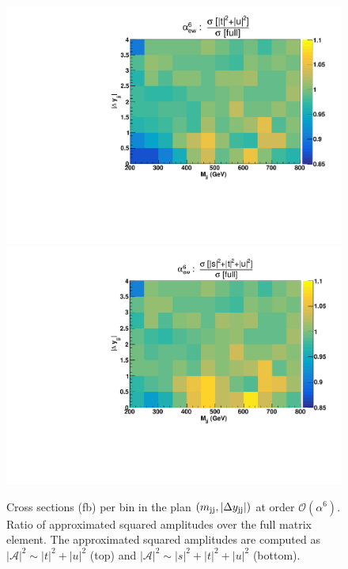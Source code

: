 \begin{figure}[hbt]
\centering
\includegraphics[scale=0.395]{figures/scanfigures/ratio_tu.pdf}
\includegraphics[scale=0.395]{figures/scanfigures/ratio_stu.pdf}
\caption{Cross sections (fb) per bin in the plan $\left(m_{\text{j}\text{j}}, |\Delta y_{\text{j}\text{j}}| \right)$ at order $\mathcal{O}(\alpha^6)$.
Ratio of approximated squared amplitudes over the full matrix element. The approximated squared amplitudes are computed as $|\mathcal{A}|^2 \sim |t|^2 + |u|^2$ (top) and $|\mathcal{A}|^2 \sim |s|^2 + |t|^2 + |u|^2$ (bottom).}
\label{fig:ratio2d_LO}
\end{figure}
